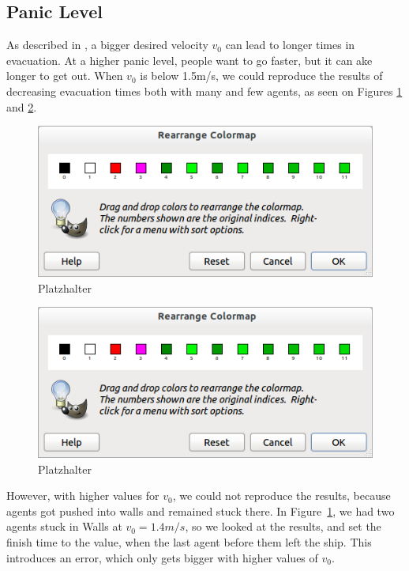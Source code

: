 \documentclass[11pt]{article}
\begin{document}

\subsection{Panic Level} %
As described in \cite{helbing}, a bigger desired velocity \(v_0\) 
can lead to longer times in evacuation.
At a higher panic level, people want to go faster, but it can ake longer to get out.
When \(v_0\) is below 1.5m/s, we could reproduce the results of decreasing evacuation times
both with many and few agents, as seen on Figures \ref{evactimes1to11} and \ref{evactimes23to33}.

\begin{figure}[h]
	\centering
	\includegraphics[scale=0.5]{images/gimp.png}
	\caption{Platzhalter}
	\label{evactimes1to11}
	
\end{figure}

\begin{figure}[h]
	\centering
	\includegraphics[scale=0.5]{images/gimp.png}
	\caption{Platzhalter}
	\label{evactimes23to33}
	
\end{figure}

However, with higher values for \(v_0\), we could not reproduce the results, because
agents got pushed into walls and remained stuck there. In Figure~\ref{evactimes1to11},
we had two agents stuck in Walls at \(v_0 = 1.4m/s\), so we looked at the results,
and set the finish time to the value, when the last agent before them left
the ship. This introduces an error, which only gets bigger with higher values of \(v_0\).
\end{document}
